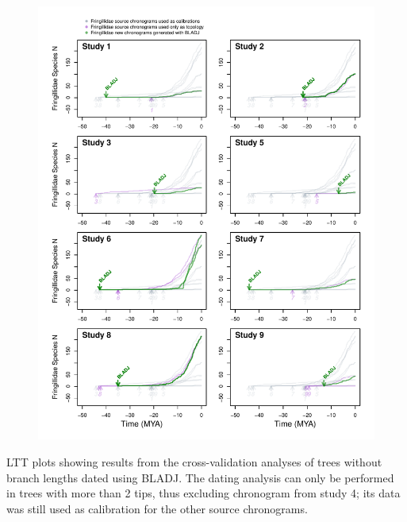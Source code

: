 \documentclass[
  english,
  man]{apa6}
\begin{document}
\begin{figure}[!h]
\includegraphics{../figures/fig_crossval_bladj.pdf}
\caption{}
\label{fig:cvbladj}
\end{figure}
LTT plots showing results from the cross-validation analyses of trees without branch lengths dated using BLADJ. The dating analysis can only be performed in trees with more than 2 tips, thus excluding chronogram from study 4; its data was still used as calibration for the other source chronograms.
\newpage
\end{document}
